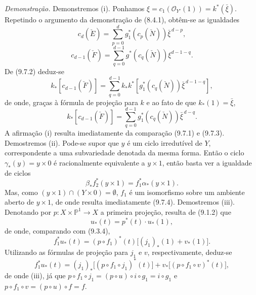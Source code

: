 \emph{Demonstração.} Demonstremos (i). Ponhamos $\xi=c_1(\mathcal O_{Y'}(1))=k^*(\bar\xi)$. Repetindo o argumento da demonstração de (8.4.1), obtêm-se as igualdades
\[
c_d(\check E)=\sum_{p=0}^d g_1^*(c_p(\check N))\bar\xi^{\,d-p},
\tag{9.7.1}
\]
\[
c_{d-1}(\check F)=\sum_{q=0}^{d-1}g^*(c_q(\check N))\xi^{d-1-q}.
\tag{9.7.2}
\]
De (9.7.2) deduz-se
\[
k_*[c_{d-1}(\check F)]
=\sum_{q=0}^{d-1}k_*k^*[g_1^*(c_q(\check N))\bar\xi^{\,d-1-q}],
\]
de onde, graças à fórmula de projeção para $k$ e ao fato de que $k_*(1)=\bar\xi$,
\[
k_*[c_{d-1}(\check F)]=\sum_{q=0}^{d-1}g_1^*(c_q(\check N))\bar\xi^{\,d-q}.
\tag{9.7.3}
\]
A afirmação (i) resulta imediatamente da comparação (9.7.1) e (9.7.3). Demostremos (ii). Pode-se supor que $y$ é um ciclo irredutível de $Y$, correspondente a uma subvariedade denotada da mesma forma. Então o ciclo $\gamma_*(y)=y\times0$ é racionalmente equivalente a $y\times1$, então basta ver a igualdade de ciclos
\[
\beta_*f_2^*(y\times1)=f_1^*\alpha_*(y\times1).
\tag{9.7.4}
\]
Mas, como $(y\times1)\cap(Y\times0)=\emptyset$, $f_1$ é um isomorfismo sobre um ambiente aberto de $y\times1$, de onde resulta imediatamente (9.7.4). Demostremos (iii). Denotando por $p:X\times\mathbb P^1\to X$ a primeira projeção, resulta de (9.1.2) que
\[
u_*(t)=p^*(t)\cdot u_*(1),
\tag{9.7.5}
\]
de onde, comparando com (9.3.4),
\[
f_1^*u_*(t)=(p\circ f_1)^*(t)\bigl[(j_1)_*(1)+v_*(1)\bigr].
\tag{9.7.6}
\]
Utilizando as fórmulas de projeção para $j_1$ e $v$, respectivamente, deduz-se
\[
f_1^*u_*(t)=(j_1)_*\bigl[(p\circ f_1\circ j_1)^*(t)\bigr]+v_*\bigl[(p\circ f_1\circ v)^*(t)\bigr],
\tag{9.7.7}
\]
de onde (iii), já que $p\circ f_1\circ j_1=(p\circ u)\circ i\circ g_1=i\circ g_1$ e $p\circ f_1\circ v=(p\circ u)\circ f=f$.

